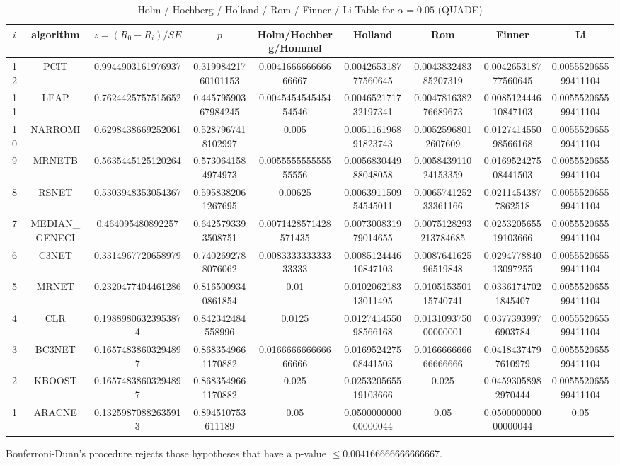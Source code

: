 \documentclass[a4paper,10pt]{article}
\begin{document}
\begin{landscape}
\begin{table}[!htp]
\centering\scriptsize
\caption{Holm / Hochberg / Holland / Rom / Finner / Li Table for $\alpha=0.05$ (QUADE)}
\begin{tabular}{ccccccccc}
$i$&algorithm&$z=(R_0 - R_i)/SE$&$p$&Holm/Hochberg/Hommel&Holland&Rom&Finner&Li\\
\hline
12&PCIT&0.9944903161976937&0.31998421760101153&0.004166666666666667&0.004265318777560645&0.004383248385207319&0.004265318777560645&0.005552065599411104\\
11&LEAP&0.7624425757515652&0.44579590367984245&0.004545454545454546&0.004652171732197341&0.004781638276689673&0.008512444610847103&0.005552065599411104\\
10&NARROMI&0.6298438669252061&0.5287967418102997&0.005&0.005116196891823743&0.00525968012607609&0.012741455098566168&0.005552065599411104\\
9&MRNETB&0.5635445125120264&0.5730641584974973&0.005555555555555556&0.005683044988048058&0.005843911024153359&0.016952427508441503&0.005552065599411104\\
8&RSNET&0.5303948353054367&0.5958382061267695&0.00625&0.006391150954545011&0.006574125233361166&0.02114543877862518&0.005552065599411104\\
7&MEDIAN_GENECI&0.464095480892257&0.6425793393508751&0.0071428571428571435&0.007300831979014655&0.0075128293213784685&0.025320565519103666&0.005552065599411104\\
6&C3NET&0.3314967720658979&0.7402692788076062&0.008333333333333333&0.008512444610847103&0.008764162596519848&0.029477884013097255&0.005552065599411104\\
5&MRNET&0.2320477404461286&0.8165009340861854&0.01&0.010206218313011495&0.010515350115740741&0.03361747021845407&0.005552065599411104\\
4&CLR&0.19889806323953874&0.842342484558996&0.0125&0.012741455098566168&0.013109375000000001&0.03773939976903784&0.005552065599411104\\
3&BC3NET&0.16574838603294897&0.8683549661170882&0.016666666666666666&0.016952427508441503&0.016666666666666666&0.04184374797610979&0.005552065599411104\\
2&KBOOST&0.16574838603294897&0.8683549661170882&0.025&0.025320565519103666&0.025&0.04593058982970444&0.005552065599411104\\
1&ARACNE&0.13259870882635913&0.894510753611189&0.05&0.050000000000000044&0.05&0.050000000000000044&0.05\\
\hline
\end{tabular}
\end{table}
Bonferroni-Dunn's procedure rejects those hypotheses that have a p-value $\le0.004166666666666667$.



\end{landscape}
\end{document}
